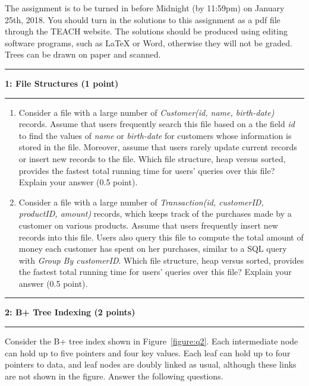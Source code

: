 \documentclass[11pt]{article}
\newcommand\question[2]{\vspace{.25in}\hrule\textbf{#1: #2}\vspace{.5em}\hrule\vspace{.10in}}
\begin{document}
\raggedright
\newcommand\NAME{Oregon State University}  %
\newcommand\ANDREWID{}     %
\newcommand\HWNUM{2}              %


The assignment is to be turned in before Midnight (by 11:59pm) on January 25th, 2018. 
You should turn in the solutions to this assignment as a pdf file through the TEACH website.
The solutions should be produced using editing software programs, such as LaTeX or Word, otherwise they will not be graded.
Trees can be drawn on paper and scanned.


\question{1}{File Structures (1 point)}
\begin{enumerate}
\item Consider a file with a large number of \textit{Customer(id, name, birth-date)} records. Assume that users frequently search this file based on a the field \textit{id} to find the values of \textit{name} or \textit{birth-date} for customers whose information is stored in the file. Moreover, assume that users rarely update current records or insert new records to the file. Which file structure, heap versus sorted, provides the fastest total running time for users' queries over this file? Explain your answer (0.5 point).\\

\item Consider a file with a large number of \textit{Transaction(id, customerID, productID, amount)} records, which keeps track of the purchases made by a customer on various products. Assume that users frequently insert new records into this file. Users also query this file to compute the total amount of money each customer has spent on her purchases, similar to a SQL query with {\it Group By customerID}. Which file structure, heap versus sorted, provides the fastest total running time for users' queries over this file?  Explain your answer (0.5 point).
\end{enumerate}


\question{2}{B+ Tree Indexing (2 points)}
Consider the B+ tree index shown in Figure~\ref{figure:q2}. 
Each intermediate node can hold up to five pointers and four key values. Each leaf can hold up to four pointers to data, and leaf nodes are doubly linked as usual, although these links are not shown in the figure.
Answer the following questions.
\end{document}
